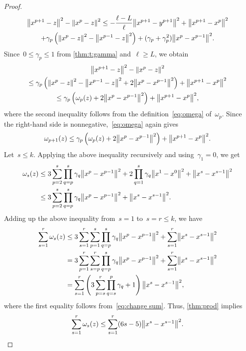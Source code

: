 \documentclass[../main]{subfiles}
\begin{document}
\begin{proof}
    \begin{multline}
        \norm*{x^{p + 1} - z}^2 - \norm*{x^p - z}^2
        \le - \frac{\ell - L}{\ell} \norm*{x^{p + 1} - y^{p + 1}}^2 + \norm*{x^{p + 1} - x^p}^2 \\
        + \gamma_p \left( \norm*{x^p - z}^2 - \norm*{x^{p - 1} - z}^2 \right) + ( \gamma_p + \gamma_p^2 ) \norm*{x^p - x^{p - 1}}^2
    .\end{multline}
    Since~$0 \le \gamma_p \le 1$ from \cref{thm:t:gamma} and~$\ell \ge L$, we obtain
    \begin{multline}
        \norm*{x^{p + 1} - z}^2 - \norm*{x^p - z}^2 \\
        \le \gamma_p \left( \norm*{x^p - z}^2 - \norm*{x^{p - 1} - z}^2 + 2 \norm*{x^p - x^{p - 1}}^2 \right) + \norm*{x^{p + 1} - x^p}^2 \\
        \le \gamma_p \left( \omega_p(z) + 2 \norm*{x^p - x^{p - 1}}^2 \right) + \norm*{x^{p + 1} - x^p}^2
    ,\end{multline}
    where the second inequality follows from the definition~\cref{eq:omega} of~$\omega_p$.
    Since the right-hand side is nonnegative,~\cref{eq:omega} again gives
    \[
        \omega_{p + 1}(z) \le \gamma_p \left( \omega_p(z) + 2 \norm*{x^p - x^{p - 1}}^2 \right) + \norm*{x^{p + 1} - x^p}^2 
    .\]
    Let~$s \le k$.
    Applying the above inequality recursively and using~$\gamma_1 = 0$, we get
    \[
        \begin{split}
            \omega_s(z) &\le 3 \sum_{p = 2}^{s} \prod_{q = p}^{s} \gamma_q \norm*{x^p - x^{p - 1}}^2 + 2 \prod_{q = 1}^{s} \gamma_q \norm*{x^1 - x^0}^2 + \norm*{x^s - x^{s - 1}}^2 \\
                        &\le 3 \sum_{p = 2}^{s} \prod_{q = p}^{s} \gamma_q \norm*{x^p - x^{p - 1}}^2 + \norm*{x^s - x^{s - 1}}^2
        .\end{split}
    \]
    Adding up the above inequality from~$s = 1$ to~$s = r \le k$, we have
    \[
        \begin{split}
        \sum_{s = 1}^r \omega_s(z)
        &\le 3 \sum_{s = 1}^r \sum_{p = 1}^s \prod_{q = p}^s \gamma_q \norm*{x^p - x^{p - 1}}^2 + \sum_{s = 1}^r \norm*{x^s - x^{s - 1}}^2 \\
        &= 3 \sum_{p = 1}^r \sum_{s = p}^r \prod_{q = p}^s \gamma_q \norm*{x^p - x^{p - 1}}^2 + \sum_{s = 1}^r \norm*{x^s - x^{s - 1}}^2 \\
        &= \sum_{s = 1}^r \left( 3 \sum_{p = s}^r \prod_{q = s}^p \gamma_q + 1 \right) \norm*{x^s - x^{s - 1}}^2
        ,\end{split}
    \]
    where the first equality follows from~\cref{eq:change sum}.
    Thus, \cref{thm:prod} implies
    \[
        \sum_{s = 1}^{r} \omega_s(z) \le \sum_{s = 1}^{r} (6 s - 5) \norm*{x^s - x^{s - 1}}^2 
    .\]


\end{proof}
\end{document}
